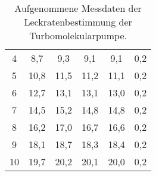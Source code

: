 \begin{table}[htp]
\begin{center}
\begin{tabular}{c|ccc|cc}
			4            &          8,7          &          9,3          &          9,1          &            9,1            &            0,2             \\
			5            &         10,8          &         11,5          &         11,2          &           11,1            &            0,2             \\
			6            &         12,7          &         13,1          &         13,1          &           13,0            &            0,2             \\
			7            &         14,5          &         15,2          &         14,8          &           14,8            &            0,2             \\
			8            &         16,2          &         17,0          &         16,7          &           16,6            &            0,2             \\
			9            &         18,1          &         18,7          &         18,3          &           18,4            &            0,2             \\
			10            &         19,7          &         20,2          &         20,1          &           20,0            &            0,2             \\ \bottomrule
		\end{tabular}
		\caption{Aufgenommene Messdaten der Leckratenbestimmung der Turbomolekularpumpe.}
		\label{tab9}
	\end{center}
\end{table}
